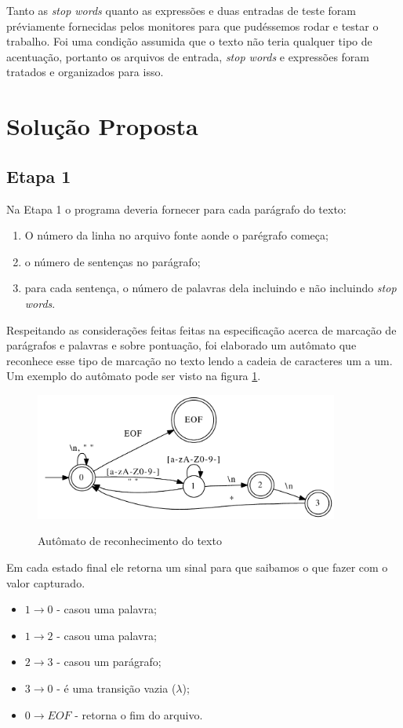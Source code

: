 \documentclass[12pt]{article}
\begin{document}
Tanto as \textit{stop words} quanto as expressões e duas entradas de teste foram préviamente fornecidas pelos monitores para que pudéssemos rodar e testar o trabalho. Foi uma condição assumida que o texto não teria qualquer tipo de acentuação, portanto os arquivos de entrada, \textit{stop words} e expressões foram tratados e organizados para isso.

\section{Solução Proposta}
\label{solucao_proposta}

\subsection{Etapa 1}
Na Etapa 1 o programa deveria fornecer para cada parágrafo do texto:
\begin{enumerate}
  \item O número da linha no arquivo fonte aonde o parégrafo começa;
  \item o número de sentenças no parágrafo;
  \item para cada sentença, o número de palavras dela incluindo e não incluindo \textit{stop words}.	
\end{enumerate}

Respeitando as considerações feitas feitas na especificação acerca de marcação de parágrafos e palavras e sobre pontuação, foi elaborado um autômato que reconhece esse tipo de marcação no texto lendo a cadeia de caracteres um a um. Um exemplo do autômato pode ser visto na figura \ref{img:automato}.

\begin{figure}[ht!]
\centering
\includegraphics[width=10.0cm]{automato.pdf}
\label{img:automato}
\caption{Autômato de reconhecimento do texto}
\end{figure}

Em cada estado final ele retorna um sinal para que saibamos o que fazer com o valor capturado.
\begin{itemize}
  \item $1 \longrightarrow 0$ - casou uma palavra;
  \item $1 \longrightarrow 2$ - casou uma palavra;
  \item $2 \longrightarrow 3$ - casou um parágrafo;
  \item $3 \longrightarrow 0$ - é uma transição vazia ($\lambda$);
  \item $0 \longrightarrow EOF$ - retorna o fim do arquivo.
\end{itemize}
\end{document}
